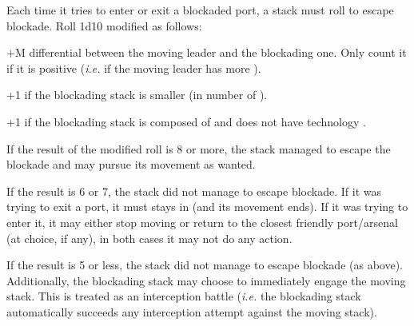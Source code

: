 Each time it tries to enter or exit a blockaded port, a stack must roll to
escape blockade. Roll 1d10 modified as follows:
\begin{modlist}
\item[+M] \Man differential between the moving leader and the blockading
  one. Only count it if it is positive (\emph{i.e.} if the moving leader has
  more \Man).
\item[+1] if the blockading stack is smaller (in number of \ND).
\item[+1] if the blockading stack is composed of \NWD and does not have
  technology \TSF.
\end{modlist}

If the result of the modified roll is 8 or more, the stack managed to escape
the blockade and may pursue its movement as wanted.

If the result is 6 or 7, the stack did not manage to escape blockade. If it
was trying to exit a port, it must stays in (and its movement ends). If it was
trying to enter it, it may either stop moving or return to the closest
friendly port/arsenal (at choice, if any), in both cases it may not do any
action.

If the result is 5 or less, the stack did not manage to escape blockade (as
above). Additionally, the blockading stack may choose to immediately engage
the moving stack. This is treated as an interception battle (\emph{i.e.} the
blockading stack automatically succeeds any interception attempt against the
moving stack).


